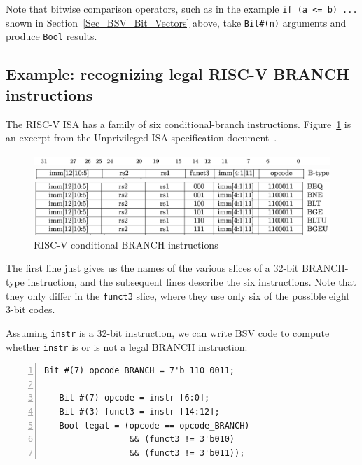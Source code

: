 Note that bitwise comparison operators, such as in the example
\verb|if (a <= b) ...| shown in Section~\ref{Sec_BSV_Bit_Vectors}
above, take \verb|Bit#(n)| arguments and produce \verb|Bool| results.


\subsection{Example: recognizing legal RISC-V BRANCH instructions}

The RISC-V ISA has a family of six conditional-branch instructions.
Figure~\ref{Fig_Combo_BRANCH_instrs} is an excerpt from the Unprivileged ISA
specification document~\cite{RISCV_Unpriv_2019_12_13}.
\begin{figure}[htbp]
  \centerline{\includegraphics[width=6in,angle=0]{Figures/Fig_Combo_BRANCH_instrs_1}}
  \centerline{\includegraphics[width=6in,angle=0]{Figures/Fig_Combo_BRANCH_instrs_2}}
  \vspace{2mm}
  \centerline{\includegraphics[width=6in,angle=0]{Figures/Fig_Combo_BRANCH_instrs_3}}
  \caption{\label{Fig_Combo_BRANCH_instrs}RISC-V conditional BRANCH instructions}
\end{figure}
The first line just gives us the names of the various slices of a
32-bit BRANCH-type instruction, and the subsequent lines describe the
six instructions.  Note that they only differ in the \verb|funct3|
slice, where they use only six of the possible eight 3-bit codes.

Assuming \verb|instr| is a 32-bit instruction, we can write BSV code
to compute whether \verb|instr| is or is not a legal BRANCH
instruction:

{\small
\begin{Verbatim}[frame=single, numbers=left]
   Bit #(7) opcode_BRANCH = 7'b_110_0011;

   Bit #(7) opcode = instr [6:0];
   Bit #(3) funct3 = instr [14:12];
   Bool legal = (opcode == opcode_BRANCH)
                 && (funct3 != 3'b010)
                 && (funct3 != 3'b011));
\end{Verbatim}
}

